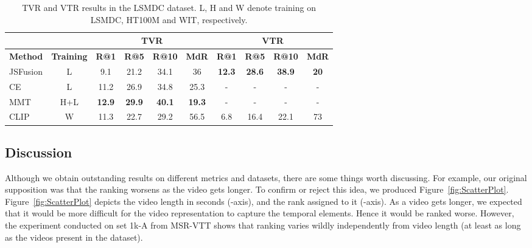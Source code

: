 \documentclass[a4paper,runningheads]{llncs}
\begin{document}
\begin{table}[ht!]
\centering
\begin{tabular}{lccccccccc}
\cmidrule(l){3-10}
\multicolumn{1}{l}{}           & \multicolumn{1}{l}{} & \multicolumn{4}{c}{\textbf{TVR}}                    & \multicolumn{4}{c}{\textbf{VTR}}                   \\ \hline
\textbf{Method}                & \textbf{Training}    & \textbf{R@1}  & \textbf{R@5}  & \textbf{R@10} & \textbf{MdR}  & \textbf{R@1}  & \textbf{R@5}  & \textbf{R@10} & \textbf{MdR} \\ \hline
JSFusion \cite{Yu2018JSFusion} & L                    & 9.1           & 21.2          & 34.1          & 36            & \textbf{12.3} & \textbf{28.6} & \textbf{38.9} & \textbf{20}  \\
CE \cite{Liu2020CE}            & L                    & 11.2          & 26.9          & 34.8          & 25.3          & -             & -             & -             & -            \\
MMT \cite{Gabeur2020MMT}       & H+L                  & \textbf{12.9} & \textbf{29.9} & \textbf{40.1} & \textbf{19.3} & -             & -             & -             & -            \\ \hline
CLIP                           & W                    & 11.3          & 22.7          & 29.2          & 56.5          & 6.8           & 16.4          & 22.1          & 73           \\ \hline
\end{tabular}
\caption{TVR and VTR results in the LSMDC dataset. L, H and W denote training on LSMDC, HT100M and WIT, respectively.}
\label{table:BigLSMDC}
\end{table}

\subsection{Discussion}
\label{sec:Discussion}

Although we obtain outstanding results on different metrics and datasets, there are some things worth discussing. For example, our original supposition was that the ranking worsens as the video gets longer. To confirm or reject this idea, we produced Figure~\ref{fig:ScatterPlot}. Figure~\ref{fig:ScatterPlot} depicts the video length in seconds (-axis), and the rank assigned to it (-axis). As a video gets longer, we expected that it would be more difficult for the video representation to capture the temporal elements. Hence it would be ranked worse. However, the experiment conducted on set 1k-A from MSR-VTT shows that ranking varies wildly independently from video length (at least as long as the videos present in the dataset).
\end{document}

